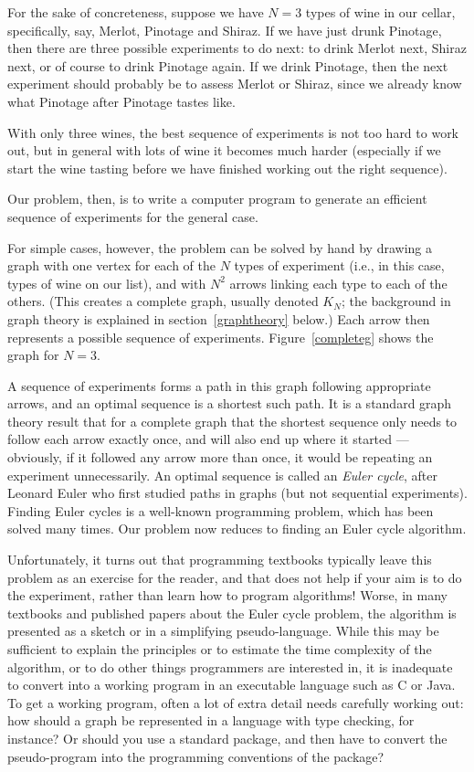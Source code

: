 \documentclass[12pt]{article}
\begin{document}
For the sake of concreteness, suppose we have $N=3$ types of wine in our cellar, specifically, say, Merlot, Pinotage and Shiraz. If we have just drunk Pinotage, then there are three possible experiments to do next: to drink Merlot next, Shiraz next, or of course to drink Pinotage again. If we drink Pinotage, then the next experiment should probably be to assess Merlot or Shiraz, since we already know what Pinotage after Pinotage tastes like. 

With only three wines, the best sequence of experiments is not too hard to work out, but in general with lots of wine it becomes much harder (especially if we start the wine tasting before we have finished working out the right sequence).

Our problem, then, is to write a computer program to generate an efficient sequence of experiments for the general case. 

For simple cases, however, the problem can be solved by hand by drawing a graph with one vertex for each of the $N$ types of experiment (i.e., in this case, types of wine on our list), and with $N^2$ arrows linking each type to each of the others. (This creates a complete graph, usually denoted $K_N$; the background in graph theory is explained in section~\ref{graphtheory} below.) Each arrow then represents a possible sequence of experiments. Figure~\ref{completeg} shows the graph for $N=3$. 

A sequence of experiments forms a path in this graph following appropriate arrows, and an optimal sequence is a shortest such path. It is a standard graph theory result that for a complete graph that the shortest sequence only needs to follow each arrow exactly once, and will also end up where it started --- obviously, if it followed any arrow more than once, it would be repeating an experiment unnecessarily. An optimal sequence is called an \emph{Euler cycle}, after Leonard Euler who first studied paths in graphs (but not sequential experiments). Finding Euler cycles is a well-known programming problem, which has been solved many times. Our problem now reduces to finding an Euler cycle algorithm.

Unfortunately, it turns out that programming textbooks typically leave this problem as an exercise for the reader, and that does not help if your aim is to do the experiment, rather than learn how to program algorithms! Worse, in many textbooks and published papers about the Euler cycle problem, the algorithm is presented as a sketch or in a simplifying pseudo-language. While this may be sufficient to explain the principles or to estimate the time complexity of the algorithm, or to do other things programmers are interested in, it is inadequate to convert into a working program in an executable language such as C or Java. To get a working program, often a lot of extra detail needs carefully working out: how should a graph be represented in a language with type checking, for instance? Or should you use a standard package, and then have to convert the pseudo-program into the programming conventions of the package?
\end{document}
